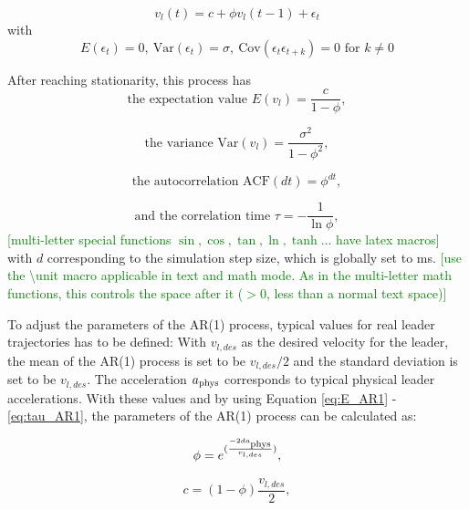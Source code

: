 \documentclass[review]{elsarticle}
\providecommand{\green}[1]{\textcolor{green}{#1}}
\providecommand{\martinc}[1]{\green{[#1]}} %
\providecommand{\sub}[1]{_{\text{{\scriptsize \hspace{-0.0ex}#1}}}}
\providecommand{\3}{{\ss}}
\begin{document}
\begin{equation} \label{eq:AR1}
	v_l(t) = c+\phi v_l(t-1)+ \epsilon_t
\end{equation}
with
\begin{equation}
    E(\epsilon_t) = 0, \ \text{Var}(\epsilon_t) = \sigma, \ 
\text{Cov}(\epsilon_t\epsilon_{t+k})=0 \text{ for }k\neq 0
\end{equation}

After reaching stationarity, this process has 
\begin{equation}
\label{eq:E_AR1}
 \text{the expectation value }E(v_l) = \frac{c}{1-\phi}, 
 \end{equation}
 
 \begin{equation}
 \label{eq:V_AR1}
 \text{the variance }\text{Var}(v_l) = \frac{\sigma^2}{1-\phi^2}, 
 \end{equation}

 \begin{equation}
 \label{eq:ACF_AR1}
\text{the autocorrelation  }\text{ACF}(dt) = \phi^{dt}, 
\end{equation}

 \begin{equation}
 \label{eq:tau_AR1}
\text{and the correlation time  }\tau = -\frac{1}{\ln \phi}, 
\end{equation}
\martinc{multi-letter special functions $\sin, \cos, \tan, \ln, \tanh
  ...$ have latex macros}
with $d$ corresponding to the simulation step size, which is globally
set to \unit[100]{ms}. \martinc{use the \textbackslash unit macro applicable
  in text and math mode. As in the multi-letter math functions, this
  controls the space after it ($>0$, less than a normal text space)} 

To adjust the parameters of the AR(1) process, typical values for real leader trajectories has to be defined: With $v_{l,des}$ as the desired velocity for the leader, the mean of the AR(1) process is set to be $v_{l,des}/2$ and the standard deviation is set to be $v_{l,des}$. The acceleration $a\sub{phys}$ corresponds to typical physical leader accelerations. With these values and by using Equation \ref{eq:E_AR1} - \ref{eq:tau_AR1}, the parameters of the AR(1) process can be calculated as:

 \begin{equation}
\phi = e^{(\frac{-2da\sub{phys}}{v_{l,des}})},
\end{equation}

 \begin{equation}
c=(1-\phi)\frac{v_{l,des}}{2},
\end{equation}
\end{document}
